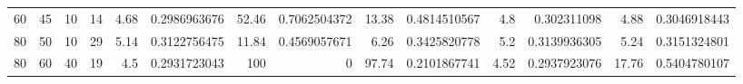 \begin{tabular}{rrrrrrrrrrrrrr}
60 & 45 & 10 & 14 & 4.68 & 0.2986963676 & 52.46 & 0.7062504372 & 13.38 & 0.4814510567 & 4.8 & 0.302311098 & 4.88 & 0.3046918443 \\
80 & 50 & 10 & 29 & 5.14 & 0.3122756475 & 11.84 & 0.4569057671 & 6.26 & 0.3425820778 & 5.2 & 0.3139936305 & 5.24 & 0.3151324801 \\
80 & 60 & 40 & 19 & 4.5 & 0.2931723043 & 100 & 0 & 97.74 & 0.2101867741 & 4.52 & 0.2937923076 & 17.76 & 0.5404780107 \\
\end{tabular}
